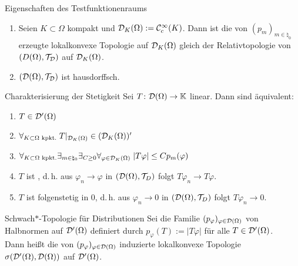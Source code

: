 \linie

\begin{Lemma}{Eigenschaften des Testfunktionenraums}
    \begin{enumerate}
        \item
        Seien $K \subset \Omega$ kompakt und $\mathcal{D}_K(\Omega) := \mathcal{C}^\infty_c(K)$.
        Dann ist die von $(p_m)_{m \in \natural_0}$ erzeugte lokalkonvexe Topologie
        auf $\mathcal{D}_K(\Omega)$ gleich der
        Relativtopologie von $(D(\Omega), \mathcal{T}_{\mathcal{D}})$ auf $\mathcal{D}_K(\Omega)$.

        \item
        $(\mathcal{D}(\Omega), \mathcal{T}_{\mathcal{D}})$ ist hausdorffsch.
    \end{enumerate}
\end{Lemma}

\begin{Lemma}{Charakterisierung der Stetigkeit}
    Sei $T\colon \mathcal{D}(\Omega) \rightarrow \mathbb{K}$ linear.
    Dann sind äquivalent:
    \begin{enumerate}
        \item
        $T \in \mathcal{D}'(\Omega)$

        \item
        $\forall_{K \subset \Omega \text{ kpkt.}}\; T|_{\mathcal{D}_K(\Omega)} \in (\mathcal{D}_K(\Omega))'$

        \item
        $\forall_{K \subset \Omega \text{ kpkt.}} \exists_{m \in \natural_0}
        \exists_{C \ge 0} \forall_{\varphi \in \mathcal{D}_K(\Omega)}\; |T\varphi| \le C p_m(\varphi)$

        \item
        $T$ ist , d.\,h.
        aus $\varphi_n \to \varphi$ in $(\mathcal{D}(\Omega), \mathcal{T}_D)$ folgt $T\varphi_n \to T\varphi$.

        \item
        $T$ ist folgenstetig in $0$, d.\,h.
        aus $\varphi_n \to 0$ in $(\mathcal{D}(\Omega), \mathcal{T}_D)$ folgt $T\varphi_n \to 0$.
    \end{enumerate}
\end{Lemma}

\linie

\begin{Def}{Schwach$\ast$-Topologie für Distributionen}
    Sei die Familie $(p_\varphi)_{\varphi \in \mathcal{D}(\Omega)}$ von Halbnormen auf $\mathcal{D}'(\Omega)$
    definiert durch $p_\varphi(T) := |T\varphi|$ für alle $T \in \mathcal{D}'(\Omega)$.\\
    Dann heißt die von $(p_\varphi)_{\varphi \in \mathcal{D}(\Omega)}$ induzierte lokalkonvexe Topologie
    \\
    $\sigma(\mathcal{D}'(\Omega), \mathcal{D}(\Omega))$ auf $\mathcal{D}'(\Omega)$.
\end{Def}

